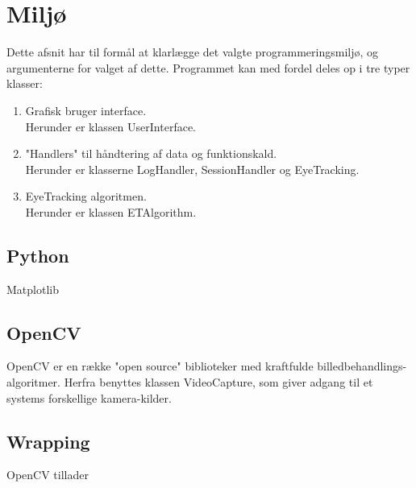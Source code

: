 \documentclass[softwarearkitektur.tex]{subfiles}
\begin{document}
\section{Miljø}
Dette afsnit har til formål at klarlægge det valgte programmeringsmiljø, og argumenterne for valget af dette. 
Programmet kan med fordel deles op i tre typer klasser:
\begin{enumerate}
	\item Grafisk bruger interface. \\
	Herunder er klassen UserInterface.
	\item "Handlers" til håndtering af data og funktionskald. \\
	Herunder er klasserne LogHandler, SessionHandler og EyeTracking.
	\item EyeTracking algoritmen. \\
	Herunder er klassen ETAlgorithm.
\end{enumerate}

\subsection{Python}
Matplotlib \cite{Matplotlib}



\subsection{OpenCV}
OpenCV \cite{openCV} er en række "open source" biblioteker med kraftfulde billedbehandlings-algoritmer. 
Herfra benyttes klassen VideoCapture, som giver adgang til et systems forskellige kamera-kilder. 

\subsection{Wrapping}
OpenCV tillader 
\end{document}
